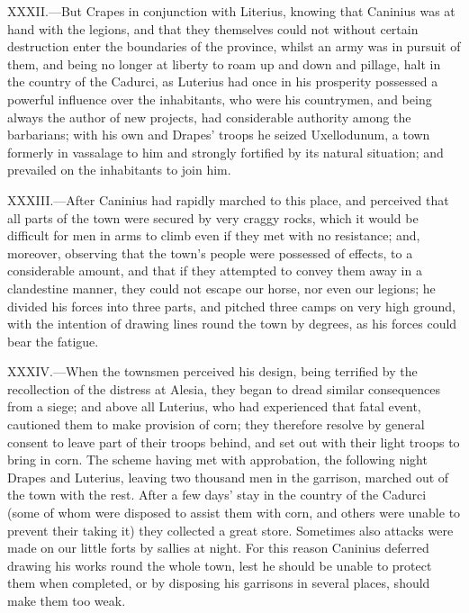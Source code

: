 XXXII.—But Crapes in conjunction with Literius, knowing that Caninius
was at hand with the legions, and that they themselves could not without
certain destruction enter the boundaries of the province, whilst an army
was in pursuit of them, and being no longer at liberty to roam up and
down and pillage, halt in the country of the Cadurci, as Luterius had
once in his prosperity possessed a powerful influence over the
inhabitants, who were his countrymen, and being always the author of new
projects, had considerable authority among the barbarians; with his own
and Drapes' troops he seized Uxellodunum, a town formerly in vassalage
to him and strongly fortified by its natural situation; and prevailed on
the inhabitants to join him.

XXXIII.—After Caninius had rapidly marched to this place, and perceived
that all parts of the town were secured by very craggy rocks, which it
would be difficult for men in arms to climb even if they met with no
resistance; and, moreover, observing that the town's people were
possessed of effects, to a considerable amount, and that if they
attempted to convey them away in a clandestine manner, they could not
escape our horse, nor even our legions; he divided his forces into three
parts, and pitched three camps on very high ground, with the intention
of drawing lines round the town by degrees, as his forces could bear the
fatigue.

XXXIV.—When the townsmen perceived his design, being terrified by the
recollection of the distress at Alesia, they began to dread similar
consequences from a siege; and above all Luterius, who had experienced
that fatal event, cautioned them to make provision of corn; they
therefore resolve by general consent to leave part of their troops
behind, and set out with their light troops to bring in corn. The scheme
having met with approbation, the following night Drapes and Luterius,
leaving two thousand men in the garrison, marched out of the town with
the rest. After a few days' stay in the country of the Cadurci (some of
whom were disposed to assist them with corn, and others were unable to
prevent their taking it) they collected a great store. Sometimes also
attacks were made on our little forts by sallies at night. For this
reason Caninius deferred drawing his works round the whole town, lest he
should be unable to protect them when completed, or by disposing his
garrisons in several places, should make them too weak.

